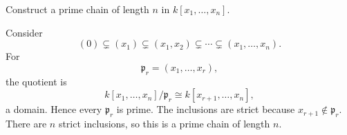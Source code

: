 \begin{problem}\label{prob:vi29-06}
Construct a prime chain of length \(n\) in \(k[x_1,\ldots,x_n]\).

\end{problem}

\ifdefined\FullProblemDossiers
\begin{solution}
Consider
\[
(0)
\subsetneq(x_1)
\subsetneq(x_1,x_2)
\subsetneq\cdots
\subsetneq(x_1,\ldots,x_n).
\]
For
\[
\mathfrak p_r=(x_1,\ldots,x_r),
\]
the quotient is
\[
k[x_1,\ldots,x_n]/\mathfrak p_r
\cong
k[x_{r+1},\ldots,x_n],
\]
a domain.  Hence every \(\mathfrak p_r\) is prime.  The inclusions are strict because \(x_{r+1}\notin\mathfrak p_r\).
There are \(n\) strict inclusions, so this is a prime chain of length \(n\).
\end{solution}
\fi
